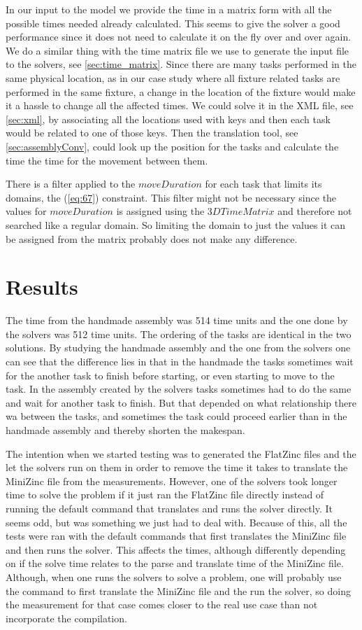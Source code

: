 In our input to the model we provide the time in a matrix form with all the possible times needed already calculated. This seems to give the solver a good performance since it does not need to calculate it on the fly over and over again. We do a similar thing with the time matrix file we use to generate the input file to the solvers, see \ref{sec:time_matrix}. Since there are many tasks performed in the same physical location, as in our case study where all fixture related tasks are performed in the same fixture, a change in the location of the fixture would make it a hassle to change all the affected times. We could solve it in the XML file, see \ref{sec:xml}, by associating all the locations used with keys and then each task would be related to one of those keys. Then the translation tool, see \ref{sec:assemblyConv}, could look up the position for the tasks and calculate the time the time for the movement between them.

There is a filter applied to the $moveDuration$ for each task that limits its domains, the (\ref{eq:67}) constraint. This filter might not be necessary since the values for $moveDuration$ is assigned using the $3DTimeMatrix$ and therefore not searched like a regular domain. So limiting the domain to just the values it can be assigned from the matrix probably does not make any difference.

\section{Results}
The time from the handmade assembly was 514 time units and the one done by the solvers was 512 time units. The ordering of the tasks are identical in the two solutions. By studying the handmade assembly and the one from the solvers one can see that the difference lies in that in the handmade the tasks sometimes wait for the another task to finish before starting, or even starting to move to the task. In the assembly created by the solvers tasks sometimes had to do the same and wait for another task to finish. But that depended on what relationship there wa between the tasks, and sometimes the task could proceed earlier than in the handmade assembly and thereby shorten the makespan.

The intention when we started testing was to generated the FlatZinc files and the let the solvers run on them in order to remove the time it takes to translate the MiniZinc file from the measurements. However, one of the solvers took longer time to solve the problem if it just ran the FlatZinc file directly instead of running the default command that translates and runs the solver directly. It seems odd, but was something we just had to deal with. Because of this, all the tests were ran with the default commands that first translates the MiniZinc file and then runs the solver. This affects the times, although differently depending on if the solve time relates to the parse and translate time of the MiniZinc file. Although, when one runs the solvers to solve a problem, one will probably use the command to first translate the MiniZinc file and the run the solver, so doing the measurement for that case comes closer to the real use case than not incorporate the compilation.

